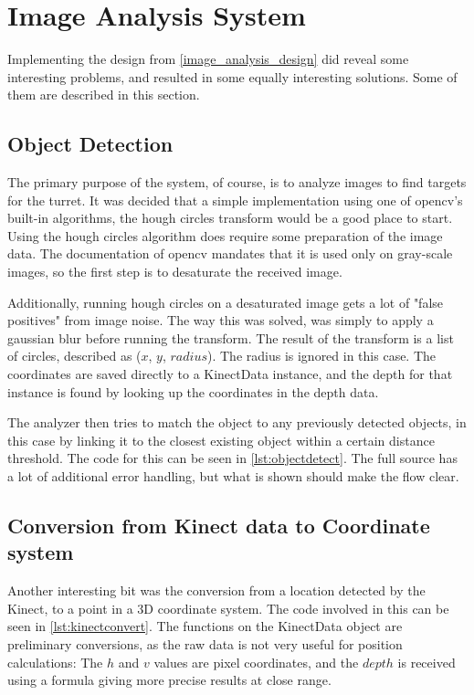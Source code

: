 \section{Image Analysis System}

Implementing the design from \autoref{image_analysis_design} did reveal some interesting problems, and resulted in
some equally interesting solutions. Some of them are described in this section.

\subsection{Object Detection}
The primary purpose of the system, of course, is to analyze images to find targets for the turret. It was decided
that a simple implementation using one of \ac{opencv}'s built-in algorithms, the hough circles transform would
be a good place to start. Using the hough circles algorithm does require some preparation of the image data.
The documentation of \ac{opencv} mandates that it is used only on gray-scale images, so the first step is to
desaturate the received image.

Additionally, running hough circles on a desaturated image gets a lot of "false positives" from image noise. The way
this was solved, was simply to apply a gaussian blur before running the transform. The result of the transform is a
list of circles, described as ($x$, $y$, $radius$). The radius is ignored in this case. The coordinates are saved directly
to a KinectData instance, and the depth for that instance is found by looking up the coordinates in the depth data.

The analyzer then tries to match the object to any previously detected objects, in this case by linking it to the closest
existing object within a certain distance threshold. The code for this can be seen in \autoref{lst:objectdetect}. The
full source has a lot of additional error handling, but what is shown should make the flow clear.



\subsection{Conversion from Kinect data to Coordinate system}
Another interesting bit
was the conversion from a location detected by the Kinect, to a point in a 3D coordinate system. The code involved
in this can be seen in \autoref{lst:kinectconvert}. The functions on the KinectData object are preliminary conversions,
as the raw data is not very useful for position calculations: The $h$ and $v$ values are pixel coordinates, and the $depth$
is received using a formula giving more precise results at close range.

